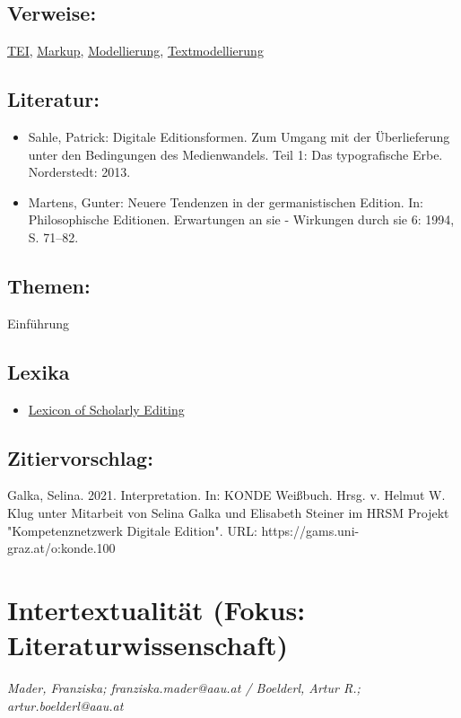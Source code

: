 \documentclass{article}
\begin{document}
        \subsection*{Verweise:}\href{https://gams.uni-graz.at/o:konde.178}{TEI}, \href{https://gams.uni-graz.at/o:konde.126}{Markup}, \href{https://gams.uni-graz.at/o:konde.137}{Modellierung}, \href{https://gams.uni-graz.at/o:konde.195}{Textmodellierung}\subsection*{Literatur:}\begin{itemize}\item Sahle, Patrick: Digitale Editionsformen. Zum Umgang mit der Überlieferung unter den Bedingungen des Medienwandels. Teil 1: Das typografische Erbe. Norderstedt: 2013.\item Martens, Gunter: Neuere Tendenzen in der germanistischen Edition. In: Philosophische Editionen. Erwartungen an sie - Wirkungen durch sie 6: 1994, S. 71–82.\end{itemize}\subsection*{Themen:}Einführung\subsection*{Lexika}\begin{itemize}\item \href{https://lexiconse.uantwerpen.be/index.php/lexicon/editor-interpretation/}{Lexicon of Scholarly Editing}\end{itemize}\subsection*{Zitiervorschlag:}Galka, Selina. 2021. Interpretation. In: KONDE Weißbuch. Hrsg. v. Helmut W. Klug unter Mitarbeit von Selina Galka und Elisabeth Steiner im HRSM Projekt "Kompetenznetzwerk Digitale Edition". URL: https://gams.uni-graz.at/o:konde.100\newpage\section*{Intertextualität (Fokus: Literaturwissenschaft)} \emph{Mader, Franziska; franziska.mader@aau.at / Boelderl, Artur R.;
                  artur.boelderl@aau.at}\\
        
\end{document}
